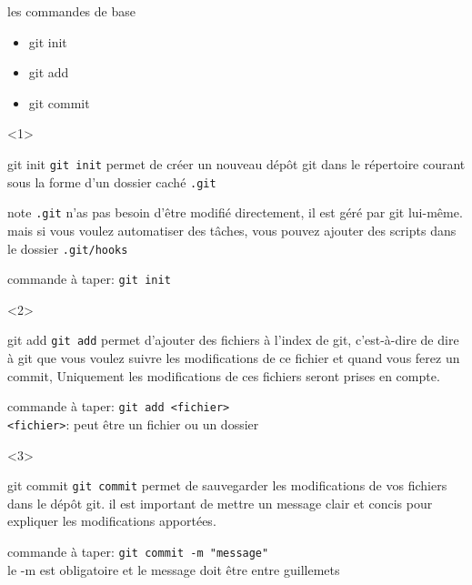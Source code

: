 \documentclass[usenames,dvipsnames]{beamer}
\begin{document}
\begin{frame}[fragile]{les commandes de base}
	\begin{itemize}
		\item<1-3> git init
		\item <2-3> git add
		\item <3-3> git commit
	\end{itemize}

	\begin{onlyenv}
		\begin{block}{git init}
			\texttt{git init} permet de créer un nouveau dépôt git dans le répertoire courant sous la forme d'un dossier caché \texttt{.git}
		\end{block}

		\begin{block}{note}
			\texttt{.git} n'as pas besoin d'être modifié directement, il est géré par git lui-même. mais si vous voulez automatiser des tâches, vous pouvez ajouter des scripts dans le dossier \texttt{.git/hooks}
		\end{block}

		commande à taper: \lstinline|git init|
	\end{onlyenv}

	\begin{onlyenv}
		\begin{block}{git add}
			\texttt{git add} permet d'ajouter des fichiers à l'index de git, c'est-à-dire de dire à git que vous voulez suivre les modifications de ce fichier et %
			quand vous ferez un commit, 
			\color{red}
			Uniquement
			\color{black}
			les modifications de ces fichiers seront prises en compte.
		\end{block}

		commande à taper: \lstinline|git add <fichier>| \\
		
		\texttt{<fichier>}: peut être un fichier ou un dossier
	\end{onlyenv}

	\begin{onlyenv}
		\begin{block}{git commit}
			\texttt{git commit} permet de sauvegarder les modifications de vos fichiers dans le dépôt git. il est important de mettre un message clair et concis pour expliquer les modifications apportées.
		\end{block}

		commande à taper: \lstinline|git commit -m "message"| \\
		le -m est obligatoire et le message doit être entre guillemets
	\end{onlyenv}
\end{frame}
\end{document}

